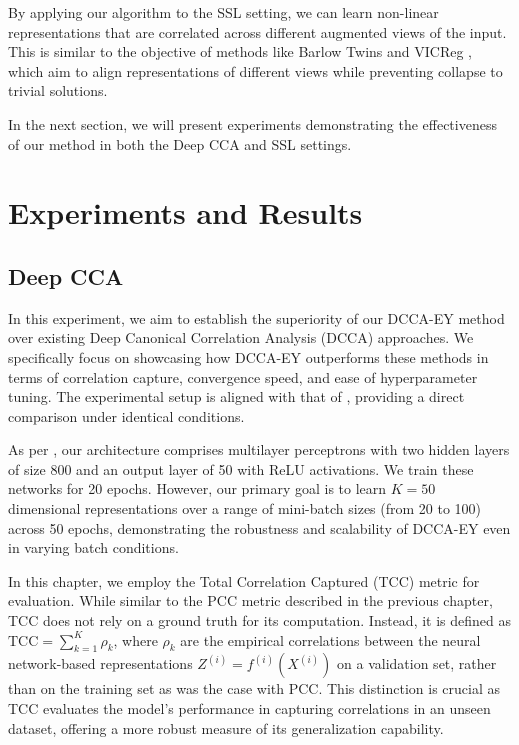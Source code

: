 By applying our algorithm to the SSL setting, we can learn non-linear representations that are correlated across different augmented views of the input. This is similar to the objective of methods like Barlow Twins \citep{zbontar2021barlow} and VICReg \citep{bardes2021vicreg}, which aim to align representations of different views while preventing collapse to trivial solutions.

In the next section, we will present experiments demonstrating the effectiveness of our method in both the Deep CCA and SSL settings.

\section{Experiments and Results}

\subsection{Deep CCA}\label{sec:experiments-DCCA}
In this experiment, we aim to establish the superiority of our DCCA-EY method over existing Deep Canonical Correlation Analysis (DCCA) approaches.
We specifically focus on showcasing how DCCA-EY outperforms these methods in terms of correlation capture, convergence speed, and ease of hyperparameter tuning.
The experimental setup is aligned with that of \citet{wang2015stochastic}, providing a direct comparison under identical conditions.

As per \citet{wang2015stochastic}, our architecture comprises multilayer perceptrons with two hidden layers of size 800 and an output layer of 50 with ReLU activations.
We train these networks for 20 epochs.
However, our primary goal is to learn $K=50$ dimensional representations over a range of mini-batch sizes (from 20 to 100) across 50 epochs, demonstrating the robustness and scalability of DCCA-EY even in varying batch conditions.

In this chapter, we employ the Total Correlation Captured (TCC) metric for evaluation.
While similar to the PCC metric described in the previous chapter, TCC does not rely on a ground truth for its computation.
Instead, it is defined as \( \text{TCC} = \sum_{k=1}^K \rho_k \), where $\rho_k$ are the empirical correlations between the neural network-based representations $Z^{(i)} = f^{(i)}(X^{(i)})$ on a validation set, rather than on the training set as was the case with PCC. This distinction is crucial as TCC evaluates the model's performance in capturing correlations in an unseen dataset, offering a more robust measure of its generalization capability.
